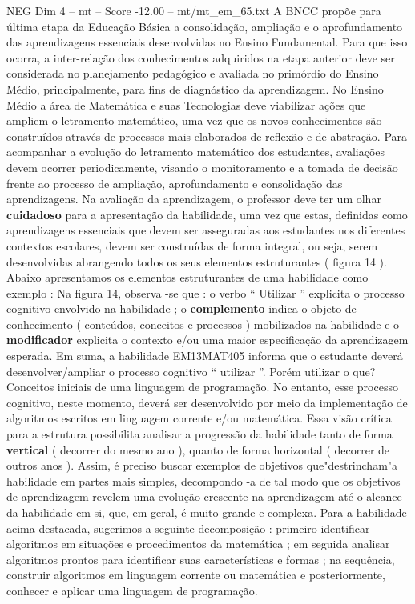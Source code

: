 \begin{textsample}{NEG Dim 4 – mt – Score -12.00 – mt/mt\_em\_65.txt}
A BNCC propõe para última etapa da Educação Básica a consolidação, ampliação e o aprofundamento das aprendizagens essenciais desenvolvidas no Ensino Fundamental.
Para que isso ocorra, a inter-relação dos conhecimentos adquiridos na etapa anterior deve ser considerada no planejamento pedagógico e avaliada no primórdio do Ensino Médio, principalmente, para fins de diagnóstico da aprendizagem.
No Ensino Médio a área de Matemática e suas Tecnologias deve viabilizar ações que ampliem o letramento matemático, uma vez que os novos conhecimentos são construídos através de processos mais elaborados de reflexão e de abstração.
Para acompanhar a evolução do letramento matemático dos estudantes, avaliações devem ocorrer periodicamente, visando o monitoramento e a tomada de decisão frente ao processo de ampliação, aprofundamento e consolidação das aprendizagens.
Na avaliação da aprendizagem, o professor deve ter um olhar \textbf{cuidadoso} para a apresentação da habilidade, uma vez que estas, definidas como aprendizagens essenciais que devem ser asseguradas aos estudantes nos diferentes contextos escolares, devem ser construídas de forma integral, ou seja, serem desenvolvidas abrangendo todos os seus elementos estruturantes ( figura 14 ).
Abaixo apresentamos os elementos estruturantes de uma habilidade como exemplo : Na figura 14, observa -se que : o verbo “ Utilizar ” explicita o processo cognitivo envolvido na habilidade ; o \textbf{complemento} indica o objeto de conhecimento ( conteúdos, conceitos e processos ) mobilizados na habilidade e o \textbf{modificador} explicita o contexto e/ou uma maior especificação da aprendizagem esperada.
Em suma, a habilidade EM13MAT405 informa que o estudante deverá desenvolver/ampliar o processo cognitivo “ utilizar ”.
Porém utilizar o que?
Conceitos iniciais de uma linguagem de programação.
No entanto, esse processo cognitivo, neste momento, deverá ser desenvolvido por meio da implementação de algoritmos escritos em linguagem corrente e/ou matemática.
Essa visão crítica para a estrutura possibilita analisar a progressão da habilidade tanto de forma \textbf{vertical} ( decorrer do mesmo ano ), quanto de forma horizontal ( decorrer de outros anos ).
Assim, é preciso buscar exemplos de objetivos que"destrincham"a habilidade em partes mais simples, decompondo -a de tal modo que os objetivos de aprendizagem revelem uma evolução crescente na aprendizagem até o alcance da habilidade em si, que, em geral, é muito grande e complexa.
Para a habilidade acima destacada, sugerimos a seguinte decomposição : primeiro identificar algoritmos em situações e procedimentos da matemática ; em seguida analisar algoritmos prontos para identificar suas características e formas ; na sequência, construir algoritmos em linguagem corrente ou matemática e posteriormente, conhecer e aplicar uma linguagem de programação.

\end{textsample}
